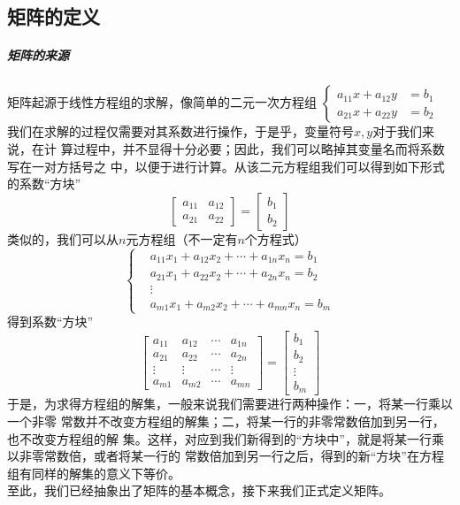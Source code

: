 \documentclass[a4paper,12pt]{ctexart}
\begin{document}
	\subsection{矩阵的定义}
		\subparagraph{矩阵的来源}
		矩阵起源于线性方程组的求解，像简单的二元一次方程组
		$
		\left\{
		\begin{array}{rl}
		a_{11}x + a_{12}y &= b_1\\
		a_{21}x + a_{22}y &= b_2
		\end{array}
		\right.
		$
		我们在求解的过程仅需要对其系数进行操作，于是乎，变量符号$x,y$对于我们来说，在计
		算过程中，并不显得十分必要；因此，我们可以略掉其变量名而将系数写在一对方括号之
		中，以便于进行计算。从该二元方程组我们可以得到如下形式的系数“方块”
		$$
		\left[
		\begin{array}{rl}
		a_{11} & a_{12}\\
		a_{21} & a_{22}
		\end{array}
		\right]
		=
		\left[
		\begin{array}{rl}
		b_1\\
		b_2
		\end{array}
		\right]
		$$
		类似的，我们可以从$n$元方程组（不一定有$n$个方程式）
		$$
		\left\{
		\begin{array}{rl}
		&a_{11}x_1 + a_{12}x_2 + \cdots + a_{1n}x_n = b_1\\
		&a_{21}x_1 + a_{22}x_2 + \cdots + a_{2n}x_n = b_2\\
		&\vdots \\
		&a_{m1}x_1 + a_{m2}x_2 + \cdots + a_{mn}x_n =b_m
		\end{array}
		\right.
		$$
		得到系数“方块”
		$$
		\left[
		\begin{array}{cccc}
		a_{11} & a_{12} & \cdots & a_{1n}\\
		a_{21} & a_{22} & \cdots & a_{2n}\\
		\vdots & \vdots & \cdots & \vdots\\
		a_{m1} & a_{m2} & \cdots & a_{mn}
		\end{array}
		\right]
		=
		\left[
		\begin{array}{rl}
		b_1\\
		b_2\\
		\vdots \\
		b_m
		\end{array}
		\right]
		$$
		\indent
		于是，为求得方程组的解集，一般来说我们需要进行两种操作：一，将某一行乘以一个非零
		常数并不改变方程组的解集；二，将某一行的非零常数倍加到另一行，也不改变方程组的解
		集。这样，对应到我们新得到的“方块中”，就是将某一行乘以非零常数倍，或者将某一行的
		常数倍加到另一行之后，得到的新“方块”在方程组有同样的解集的意义下等价。\\
		\indent
		至此，我们已经抽象出了矩阵的基本概念，接下来我们正式定义矩阵。
		
\end{document}
